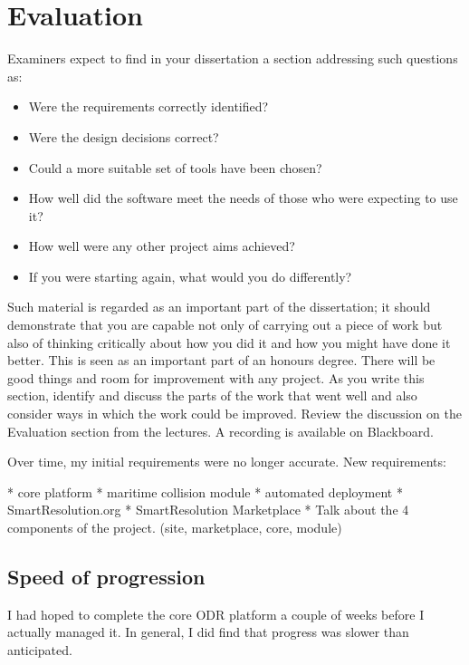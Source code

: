 \chapter{Evaluation}

Examiners expect to find in your dissertation a section addressing such questions as:

\begin{itemize}
   \item Were the requirements correctly identified? 
   \item Were the design decisions correct?
   \item Could a more suitable set of tools have been chosen?
   \item How well did the software meet the needs of those who were expecting to use it?
   \item How well were any other project aims achieved?
   \item If you were starting again, what would you do differently?
\end{itemize}

Such material is regarded as an important part of the dissertation; it should demonstrate that you are capable not only of carrying out a piece of work but also of thinking critically about how you did it and how you might have done it better. This is seen as an important part of an honours degree. There will be good things and room for improvement with any project. As you write this section, identify and discuss the parts of the work that went well and also consider ways in which the work could be improved. Review the discussion on the Evaluation section from the lectures. A recording is available on Blackboard. 


Over time, my initial requirements were no longer accurate. New requirements:

* core platform
* maritime collision module
* automated deployment
* SmartResolution.org
* SmartResolution Marketplace
* Talk about the 4 components of the project. (site, marketplace, core, module)

\section{Speed of progression}

I had hoped to complete the core ODR platform a couple of weeks before I actually managed it. In general, I did find that progress was slower than anticipated.

